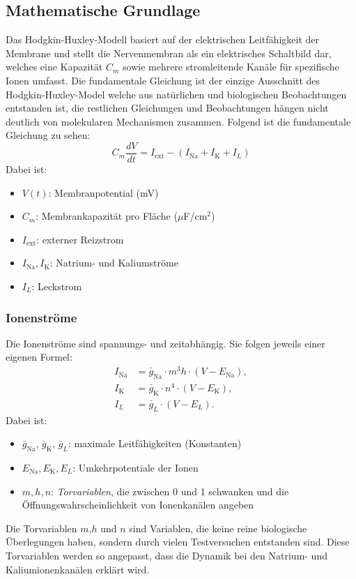 \begin{refsection}
\subsection{Mathematische Grundlage\cite{nerven:InaLammers.31.08.2015}}
Das Hodgkin-Huxley-Modell basiert auf der elektrischen Leitfähigkeit der Membrane und stellt die Nervenmembran als ein elektrisches Schaltbild dar, welches eine Kapazität $C_m$ sowie mehrere stromleitende Kanäle für spezifische Ionen umfasst.
Die fundamentale Gleichung ist der einzige Ausschnitt des Hodgkin-Huxley-Model welche aus natürlichen und biologischen Beobachtungen entstanden ist, die restlichen Gleichungen und Beobachtungen hängen nicht deutlich von molekularen Mechanismen zusammen. 
Folgend ist die fundamentale Gleichung zu sehen: \cite{nerven:InaLammers.31.08.2015}
\[C_m \frac{dV}{dt} = I_{\text{ext}} - (I_{\text{Na}} + I_{\text{K}} + I_L)\] 
\noindent
Dabei ist:

\begin{itemize}
	\item $V(t)$: Membranpotential (mV)
	\item $C_m$: Membrankapazität pro Fläche ($\mu$F/cm$^2$)
	\item $I_{\text{ext}}$: externer Reizstrom
	\item $I_{\text{Na}}, I_{\text{K}}$: Natrium- und Kaliumströme
	\item $I_L$: Leckstrom
\end{itemize}
\subsubsection{Ionenströme}
Die Ionenströme sind spannungs- und zeitabhängig. Sie folgen jeweils einer eigenen Formel:
\[
\begin{aligned}
	I_{\text{Na}} &= \bar{g}_{\text{Na}} \cdot m^3 h \cdot (V - E_{\text{Na}}), \\
	I_{\text{K}} &= \bar{g}_{\text{K}} \cdot n^4 \cdot (V - E_{\text{K}}), \\
	I_L &= \bar{g}_L \cdot (V - E_L).
\end{aligned}
\]
\noindent
Dabei ist:

\begin{itemize}
	\item $\bar{g}_{\text{Na}},\, \bar{g}_{\text{K}},\, \bar{g}_L$: maximale Leitfähigkeiten (Konstanten)
	\item $E_{\text{Na}}, E_{\text{K}}, E_L$: Umkehrpotentiale der Ionen
	\item $m, h, n$: \emph{Torvariablen}, die zwischen 0 und 1 schwanken und die Öffnungswahrscheinlichkeit von Ionenkanälen angeben
\end{itemize}
Die Torvariablen $m$,$h$ und $n$ sind Variablen, die keine reine biologische Überlegungen haben, sondern durch vielen Testversuchen entstanden sind. Diese Torvariablen werden so angepasst, dass die Dynamik bei den Natrium- und Kaliumionenkanälen erklärt wird.

\end{refsection}

